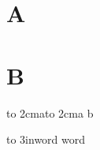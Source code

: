 \documentclass{article}
\begin{document}
\section{A}\label{s}
\section{B}\label{s}
\parbox{2cm}{\hbox to 2cm{a\hfil}\hbox to 2cm{a b}}
\hbox to 3in{word word}
\end{document}
